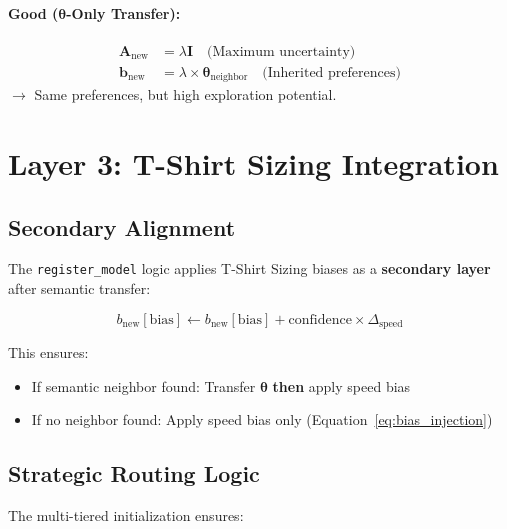 \documentclass[sigconf]{acmart}
\begin{document}
\paragraph{Good ($\boldsymbol{\theta}$-Only Transfer):}
\begin{align}
\mathbf{A}_{\text{new}} &= \lambda \mathbf{I} \quad \text{(Maximum uncertainty)} \\
\mathbf{b}_{\text{new}} &= \lambda \times \boldsymbol{\theta}_{\text{neighbor}} \quad \text{(Inherited preferences)}
\end{align}
$\rightarrow$ Same preferences, but high exploration potential.

\section{Layer 3: T-Shirt Sizing Integration}

\subsection{Secondary Alignment}

The \texttt{register\_model} logic applies T-Shirt Sizing biases as a \textbf{secondary layer} after semantic transfer:

\begin{equation}
b_{\text{new}}[\text{bias}] \leftarrow b_{\text{new}}[\text{bias}] + \text{confidence} \times \Delta_{\text{speed}}
\end{equation}

This ensures:
\begin{itemize}
    \item If semantic neighbor found: Transfer $\boldsymbol{\theta}$ \textbf{then} apply speed bias
    \item If no neighbor found: Apply speed bias only (Equation~\ref{eq:bias_injection})
\end{itemize}

\subsection{Strategic Routing Logic}

The multi-tiered initialization ensures:
\end{document}
